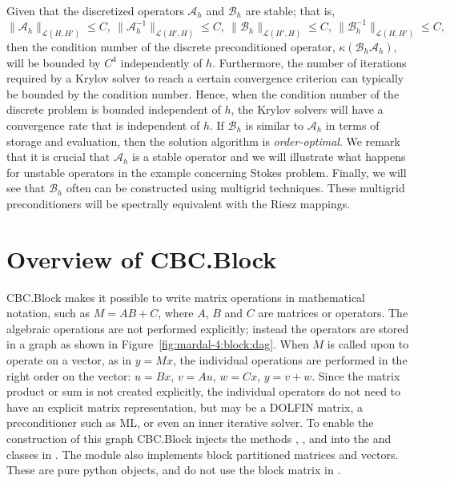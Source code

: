 Given that the discretized operators  $\mathcal{A}_h$ and $\mathcal{B}_h$ are stable; that is,
 \begin{equation}
\|\mathcal{A}_h\|_{\mathcal{L} (H, H')} \le C, \ \|\mathcal{A}_h^{-1}\|_{\mathcal{L} (H', H)} \le C, \
\|\mathcal{B}_h\|_{\mathcal{L}(H', H)} \le C,  \  \|\mathcal{B}_h^{-1}\|_{\mathcal{L}(H, H')} \le C,
\end{equation}
then the condition number of the discrete preconditioned operator,
$\kappa(\mathcal{B}_h \mathcal{A}_h)$, will be bounded by $C^4$
independently of $h$.  Furthermore, the number of iterations required
by a Krylov solver to reach a certain convergence criterion can
typically be bounded by the condition number. Hence, when the
condition number of the discrete problem is bounded independent of
$h$, the Krylov solvers will have a convergence rate that is
independent of $h$.  If $\mathcal{B}_h$ is similar to $\mathcal{A}_h$
in terms of storage and evaluation, then the solution algorithm
is \emph{order-optimal}.  We remark that it is crucial that
$\mathcal{A}_h$ is a stable operator and we will illustrate what
happens for unstable operators in the example concerning Stokes
problem.  Finally, we will see that $\mathcal{B}_h$ often can be
constructed using multigrid techniques. These multigrid
preconditioners will be spectrally equivalent with the Riesz mappings.

\section{Overview of CBC.Block}

CBC.Block makes it possible to write matrix operations in mathematical notation, such as $M = A B+C$, where $A$, $B$ and $C$ are matrices or operators. The algebraic operations are not performed explicitly; instead the operators are stored in a graph as shown in Figure~\ref{fig:mardal-4:block:dag}. When $M$ is called upon to operate on a vector, as in $y=Mx$, the individual operations are performed in the right order on the vector: $u=Bx$, $v=Au$, $w=Cx$, $y=v+w$. Since the matrix product or sum is not created explicitly, the individual operators do not need to have an explicit matrix representation, but  may be a DOLFIN matrix, a preconditioner such as ML, or even an inner iterative solver.
To enable the construction of this graph CBC.Block injects the
methods , , and 
into the \emp{Matrix} and \emp{Vector} classes in \dolfin.  The module
also implements block partitioned matrices and vectors. These are pure
python objects, and do not use the block matrix in \dolfin.

